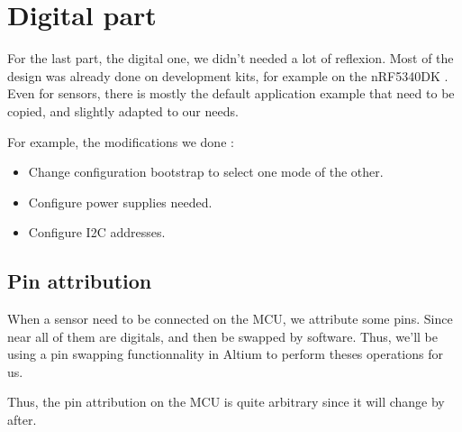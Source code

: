 \section{Digital part}
For the last part, the digital one, we didn't needed a lot of reflexion. Most of
the design was already done on development kits, for example on the nRF5340DK
\cite{nRF5340DK}. Even for sensors, there is mostly the default
application example that need to be copied, and slightly adapted to our needs.

For example, the modifications we done :
\begin{itemize}[noitemsep]
    \item   Change configuration bootstrap to select one mode of the other.
    \item   Configure power supplies needed.
    \item   Configure I2C addresses.
\end{itemize}

\subsection{Pin attribution}
When a sensor need to be connected on the MCU, we attribute some pins. Since near
all of them are digitals, and then be swapped by software. Thus, we'll be using a
pin swapping functionnality in Altium to perform theses operations for us.

Thus, the pin attribution on the MCU is quite arbitrary since it will change by after.
